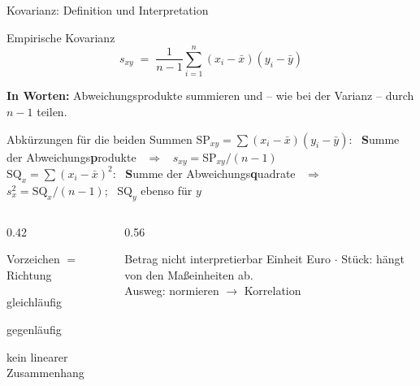 \documentclass[aspectratio=169,11pt]{beamer}
\newcommand{\SQx}{\text{SQ}_x}
\newcommand{\SQy}{\text{SQ}_y}
\newcommand{\SPxy}{\text{SP}_{xy}}
\begin{document}
\begin{frame}{Kovarianz: Definition und Interpretation}
  \begin{block}{Empirische Kovarianz}
    \vspace{-6pt}
    \[
      s_{xy} \;=\; \frac{1}{n-1} \sum_{i=1}^{n} (x_i - \bar{x})(y_i - \bar{y})
    \]
    \vspace{-8pt}

    \textbf{In Worten:} Abweichungsprodukte summieren und -- wie bei der Varianz --
    durch $n - 1$ teilen.
  \end{block}
  \begin{block}{Abkürzungen für die beiden Summen}
    \small
    $\SPxy = \sum (x_i - \bar{x})(y_i - \bar{y})$: \ \textbf{S}umme der Abweichungs\textbf{p}rodukte
    \ $\Rightarrow$ \ $s_{xy} = \SPxy/(n-1)$\\[2pt]
    $\SQx = \sum (x_i - \bar{x})^{2}$: \ \textbf{S}umme der Abweichungs\textbf{q}uadrate
    \ $\Rightarrow$ \ $s_x^{2} = \SQx/(n-1)$; \ $\SQy$ ebenso für $y$
  \end{block}
  \vspace{-6pt}

  \begin{columns}[T]
    \begin{column}{0.42\textwidth}
      \begin{block}{Vorzeichen $=$ Richtung}
        \small
        \begin{description}\setlength{\itemsep}{0pt}
          \item[$s_{xy} > 0$] gleichläufig
          \item[$s_{xy} < 0$] gegenläufig
          \item[$s_{xy} = 0$] kein linearer Zusammenhang
        \end{description}
      \end{block}
    \end{column}
    \begin{column}{0.56\textwidth}
      \begin{alertblock}{Betrag nicht interpretierbar}
        Einheit Euro $\cdot$ Stück: hängt von den Maßeinheiten ab.\\[2pt]
        Ausweg: normieren $\to$ Korrelation
      \end{alertblock}
    \end{column}
  \end{columns}
\end{frame}
\end{document}
